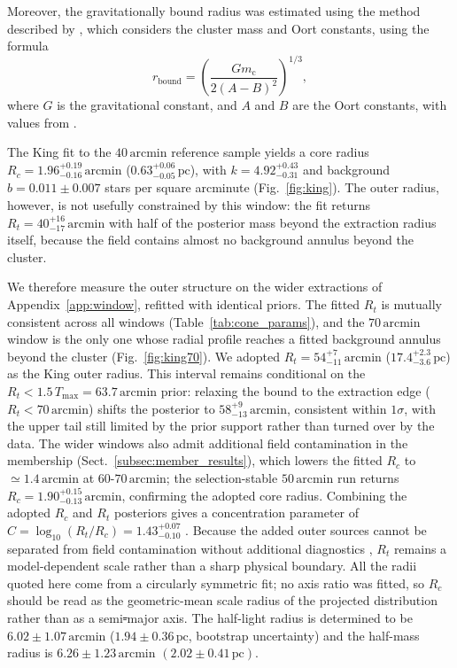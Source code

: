 \documentclass{aa}
\providecommand{\DIFaddtex}[1]{{\protect\color{red}\uwave{#1}}} %
\providecommand{\DIFdeltex}[1]{{\protect\color{red}\sout{#1}}} %
\providecommand{\DIFaddbegin}{} %
\providecommand{\DIFaddend}{} %
\providecommand{\DIFdelbegin}{} %
\providecommand{\DIFdelend}{} %
\providecommand{\DIFadd}[1]{\texorpdfstring{\DIFaddtex{#1}}{#1}} %
\providecommand{\DIFdel}[1]{\texorpdfstring{\DIFdeltex{#1}}{}} %
\providecommand{\DIFscaledelfig}{0.5}
\newlength{\DIFdelgraphicswidth} %
\newlength{\DIFdelgraphicsheight} %
\providecommand{\DIFaddincludegraphics}[2][]{{\color{blue}\fbox{\DIFOincludegraphics[#1]{#2}}}} %
\providecommand{\DIFdelincludegraphics}[2][]{%
\sbox{\DIFdelgraphicsbox}{\DIFOincludegraphics[#1]{#2}}%
\settoboxwidth{\DIFdelgraphicswidth}{\DIFdelgraphicsbox} %
\settoboxtotalheight{\DIFdelgraphicsheight}{\DIFdelgraphicsbox} %
\scalebox{\DIFscaledelfig}{%
\parbox[b]{\DIFdelgraphicswidth}{\usebox{\DIFdelgraphicsbox}\\[-\baselineskip] \rule{\DIFdelgraphicswidth}{0em}}\llap{\resizebox{\DIFdelgraphicswidth}{\DIFdelgraphicsheight}{%
\setlength{\unitlength}{\DIFdelgraphicswidth}%
\begin{picture}(1,1)%
\thicklines\linethickness{2pt} %
{\color[rgb]{1,0,0}\put(0,0){\framebox(1,1){}}}%
{\color[rgb]{1,0,0}\put(0,0){\line( 1,1){1}}}%
{\color[rgb]{1,0,0}\put(0,1){\line(1,-1){1}}}%
\end{picture}%
}\hspace*{3pt}}} %
} %
\DeclareRobustCommand{\DIFaddbegin}{\DIFOaddbegin \let\includegraphics\DIFaddincludegraphics} %
\DeclareRobustCommand{\DIFaddend}{\DIFOaddend \let\includegraphics\DIFOincludegraphics} %
\DeclareRobustCommand{\DIFdelbegin}{\DIFOdelbegin \let\includegraphics\DIFdelincludegraphics} %
\DeclareRobustCommand{\DIFdelend}{\DIFOaddend \let\includegraphics\DIFOincludegraphics} %
\begin{document}
Moreover, the gravitationally bound radius was estimated using the method described by \citet{1998MNRAS.299..955P}, which considers the cluster mass and Oort constants, using the formula
\begin{equation}
	r_\mathrm{bound} = \left( \frac{Gm_{\mathrm{c}}}{2(A-B)^2} \right)^{1/3},
\end{equation}
where $G$ is the gravitational constant, and $A$ and $B$ are the Oort constants, with values from \citet{2017MNRAS.468L..63B}.

The King fit to the $40\,\mathrm{arcmin}$ reference sample yields a core radius\DIFaddbegin \DIFadd{, }\DIFaddend $R_c = 1.96^{+0.19}_{-0.16}\,\mathrm{arcmin}$ ($0.63^{+0.06}_{-0.05}\,\mathrm{pc}$), with $k = 4.92^{+0.43}_{-0.31}$ and background $b = 0.011\pm0.007$ stars per square arcminute (Fig.~\ref{fig:king}). The outer radius, however, is not usefully constrained by this window: the fit returns $R_t = 40^{+16}_{-17}\,\mathrm{arcmin}$ with half of the posterior mass beyond the extraction radius itself, because the field contains almost no background annulus beyond the cluster.

We therefore measure\DIFaddbegin \DIFadd{d}\DIFaddend{}  the outer structure on the wider extractions of Appendix~\ref{app:window}, refitted with identical priors. The fitted $R_t$ is mutually consistent across all windows (Table~\ref{tab:cone_params}), and the $70\,\mathrm{arcmin}$ window is the only one whose radial profile reaches a fitted background annulus beyond the cluster (Fig.~\ref{fig:king70}). We adopted $R_t = 54^{+7}_{-11}\,\mathrm{arcmin}$ ($17.4^{+2.3}_{-3.6}\,\mathrm{pc}$) as the King outer radius. This interval remains conditional on the $R_t<1.5\,T_{\mathrm{max}}=63.7\,\mathrm{arcmin}$ prior: relaxing the bound to the extraction edge ($R_t<70\,\mathrm{arcmin}$) shifts the posterior to $58^{+9}_{-13}\,\mathrm{arcmin}$, consistent within $1\sigma$, with the upper tail still limited by the prior support rather than turned over by the data. The wider windows also admit additional field contamination in the membership (Sect.~\ref{subsec:member_results}), which lowers the fitted $R_c$ to $\simeq1.4\,\mathrm{arcmin}$ at $60$-\DIFaddbegin \DIFadd{-}\DIFaddend  $70\,\mathrm{arcmin}$; the selection-stable $50\,\mathrm{arcmin}$ run returns $R_c = 1.90^{+0.15}_{-0.13}\,\mathrm{arcmin}$, confirming the adopted core radius. Combining the adopted $R_c$ and $R_t$ posteriors gives a concentration parameter of $C = \log_{10}(R_t/R_c) = 1.43^{+0.07}_{-0.10}$ \citep{1975AJ.....80..427P}. Because the added outer sources cannot be separated from field contamination without additional diagnostics \citep{2025A&A...694A.258R,2025A&A...698A.156X}, $R_t$ remains a model-dependent scale rather than a sharp physical boundary. All the radii quoted here come from a circularly symmetric fit; no axis ratio was fitted, so $R_c$ should be read as the geometric-mean scale radius of the projected distribution rather than as a semi\DIFdelbegin \DIFdel{-}\DIFdelend major axis. The half-light radius is determined to be $6.02 \pm 1.07\,\mathrm{arcmin}$ ($1.94 \pm 0.36\,\mathrm{pc}$, bootstrap uncertainty) and the half-mass radius is $6.26 \pm 1.23\,\mathrm{arcmin}$ $(2.02 \pm 0.41\,\mathrm{pc})$.
\end{document}
